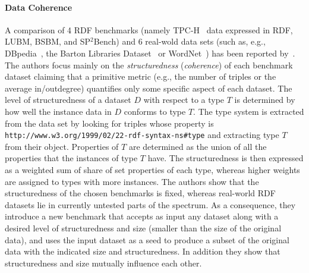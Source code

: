 
\paragraph{Data Coherence}  A comparison of 4 RDF benchmarks (namely TPC-H~\cite{TPC-H} data expressed in RDF, LUBM, BSBM, and SP$^2$Bench) and 6 real-wold data sets (such as, e.g.,  DBpedia~\cite{Bizer:2009:DCP:1640541.1640848}, the Barton Libraries Dataset~\cite{barton-benchmark} or
WordNet~\cite{Miller:1995:WLD:219717.219748}) has been reported by~\cite{Duan:2011:AOC:1989323.1989340}. The authors focus mainly on the  \emph{structuredness} (\emph{coherence}) of each benchmark dataset claiming that a primitive metric (e.g., the number of triples or the average in/outdegree) quantifies only some specific aspect of each dataset. The level of structuredness of a dataset $D$ with respect to a type $T$ is determined by how well the instance data in $D$ conforms to type $T$. The type system is extracted from the data set by looking for triples whose property is \texttt{http://www.w3.org/1999/02/22-rdf-syntax-ns\#type} and extracting type $T$ from their object. Properties of $T$ are determined as the union of all the properties that the instances of type $T$ have. The structuredness is then expressed as a weighted sum of share of set properties of each type, whereas higher weights are assigned to types with more instances. The authors show that the structuredness of the chosen benchmarks is fixed, whereas real-world RDF datasets lie in currently untested parts of the spectrum. As a consequence, they introduce a new benchmark that accepts as input any dataset along with a desired level of structuredness and size (smaller than the size of the original data), and uses the input dataset as a seed to produce a subset of the original data with the indicated size and structuredness. In addition they show that structuredness and size mutually influence each other.


